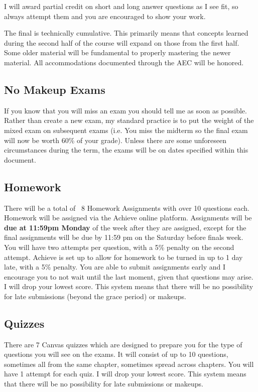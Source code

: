 I will award partial credit on short and long answer questions as I see fit, so always attempt them and you are encouraged to show your work.

The final is technically cumulative.
This primarily means that concepts learned during the second half of the course will expand on those from the first half.
Some older material will be fundamental to properly mastering the newer material.
All accommodations documented through the AEC will be honored.


\subsection*{No Makeup Exams}

If you know that you will miss an exam you should tell me as soon as possible.
Rather than create a new exam, my standard practice is to put the weight of the mixed exam on subsequent exams
(i.e. You miss the midterm so the final exam will now be worth 60\% of your grade).
Unless there are some unforeseen circumstances during the term, the exams will be on dates specified within this document.

\hypertarget{grading_HW}{\subsection{Homework}}
There will be a total of ~8 Homework Assignments with over 10 questions each.
Homework will be assigned via the Achieve online platform.
Assignments will be \textbf{due at 11:59pm Monday} of the week after they are assigned, except for the final assignments will be due by 11:59 pm on the Saturday before finals week.
You will have two attempts per question, with a 5\% penalty on the second attempt.
Achieve is set up to allow for homework to be turned in up to 1 day late, with a 5\% penalty.
You are able to submit assignments early and I encourage you to not wait until the last moment, given that questions may arise.
I will drop your lowest score.
This system means that there will be no possibility for late submissions (beyond the grace period) or makeups.
 
\hypertarget{grading_quiz}{\subsection{Quizzes}}
There are 7 Canvas quizzes which are designed to prepare you for the type of questions you will see on the exams.
It will consist of up to 10 questions, sometimes all from the same chapter, sometimes spread across chapters.
You will have 1 attempt for each quiz. I will drop your lowest score.
This system means that there will be no possibility for late submissions or makeups.

